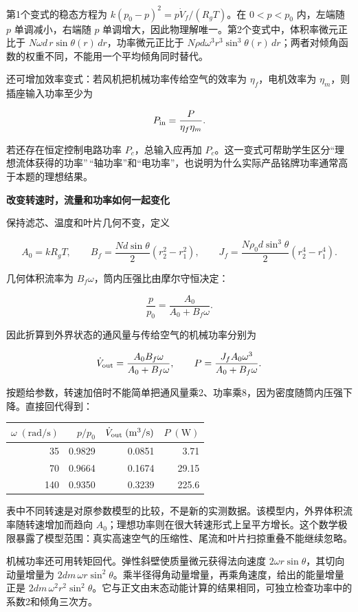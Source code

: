 \documentclass[12pt,a4paper,UTF8]{ctexart}
\begin{document}
第1个变式的稳态方程为 \(k(p_0-p)^2=p\dot V_f/(R_gT)\)。在 \(0<p<p_0\)
内，左端随 \(p\) 单调减小，右端随 \(p\)
单调增大，因此物理解唯一。第2个变式中，体积率微元正比于
\(N\omega d\,r\sin\theta(r)\,dr\)，功率微元正比于
\(N\rho d\omega^3r^3\sin^3\theta(r)\,dr\)；两者对倾角函数的权重不同，不能用一个平均倾角同时替代。

还可增加效率变式：若风机把机械功率传给空气的效率为
\(\eta_f\)，电机效率为 \(\eta_m\)，则插座输入功率至少为

\[
P_{\rm in}=\frac{P}{\eta_f\eta_m}.
\]

若还存在恒定控制电路功率 \(P_c\)，总输入应再加
\(P_c\)。这一变式可帮助学生区分``理想流体获得的功率''\,``轴功率''和``电功率''，也说明为什么实际产品铭牌功率通常高于本题的理想结果。

\textbf{改变转速时，流量和功率如何一起变化}

保持滤芯、温度和叶片几何不变，定义

\[A_0=kR_gT,\qquad B_f=\frac{Nd\sin\theta}{2}(r_2^2-r_1^2),\qquad J_f=\frac{N\rho_0d\sin^3\theta}{2}(r_2^4-r_1^4).\]

几何体积流率为 \(B_f\omega\)，筒内压强比由摩尔守恒决定：

\[\frac p{p_0}=\frac{A_0}{A_0+B_f\omega}.\]

因此折算到外界状态的通风量与传给空气的机械功率分别为

\[\dot V_{\rm out}=\frac{A_0B_f\omega}{A_0+B_f\omega},\qquad P=\frac{J_fA_0\omega^3}{A_0+B_f\omega}.\]

按题给参数，转速加倍时不能简单把通风量乘2、功率乘8，因为密度随筒内压强下降。直接回代得到：

\begin{center}
\begin{tabular}{rrrr}
\toprule
$\omega\;(\mathrm{rad/s})$ & $p/p_0$ & $\dot V_{\rm out}\;(\mathrm{m^3/s})$ & $P\;(\mathrm W)$ \\
\midrule
35 & 0.9829 & 0.0851 & 3.71 \\
70 & 0.9664 & 0.1674 & 29.15 \\
140 & 0.9350 & 0.3239 & 225.6 \\
\bottomrule
\end{tabular}
\end{center}

表中不同转速是对原参数模型的比较，不是新的实测数据。该模型内，外界体积流率随转速增加而趋向
\(A_0\)；理想功率则在很大转速形式上呈平方增长。这个数学极限暴露了模型范围：真实高速空气的压缩性、尾流和叶片扫掠重叠不能继续忽略。

机械功率还可用转矩回代。弹性斜壁使质量微元获得法向速度
\(2\omega r\sin\theta\)，其切向动量增量为
\(2dm\,\omega r\sin^2\theta\)。乘半径得角动量增量，再乘角速度，给出的能量增量正是
\(2dm\,\omega^2r^2\sin^2\theta\)。它与正文由末态动能计算的结果相同，可独立检查功率中的系数2和倾角三次方。
\end{document}
